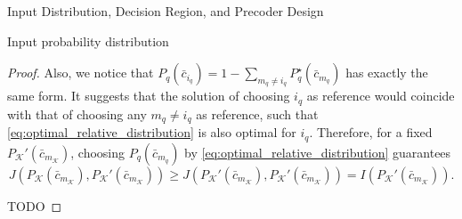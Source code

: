 \documentclass[journal]{IEEEtran}
\begin{document}
\begin{section}{Input Distribution, Decision Region, and Precoder Design}
\begin{subsection}{Input probability distribution}
\begin{proof}
				Also, we notice that $P_q(\bar{c}_{i_q}) = 1 - \sum_{m_q \ne i_q} P_q^{\star}(\bar{c}_{m_q})$ has exactly the same form. It suggests that the solution of choosing $i_q$ as reference would coincide with that of choosing any $m_q \ne i_q$ as reference, such that \eqref{eq:optimal_relative_distribution} is also optimal for $i_q$. Therefore, for a fixed $P_{\mathcal{K}}'(\bar{c}_{m_{\mathcal{K}}})$, choosing $P_q(\bar{c}_{m_q})$ by \eqref{eq:optimal_relative_distribution} guarantees
				\begin{equation}
					J \left( P_{\mathcal{K}}(\bar{c}_{m_{\mathcal{K}}}),P_{\mathcal{K}}'(\bar{c}_{m_{\mathcal{K}}}) \right) \ge J \left( P_{\mathcal{K}}'(\bar{c}_{m_{\mathcal{K}}}),P_{\mathcal{K}}'(\bar{c}_{m_{\mathcal{K}}}) \right) = I \left(P_{\mathcal{K}}'(\bar{c}_{m_{\mathcal{K}}}) \right).
				\end{equation}

				TODO


			\end{proof}



\end{subsection}
\end{section}
\end{document}
